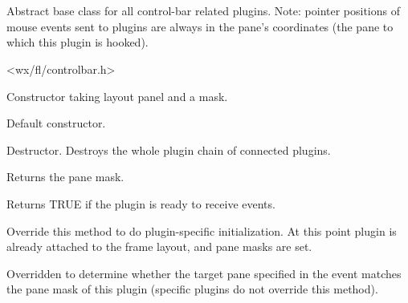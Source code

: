 %
%


\section{}\label{cbpluginbase}


Abstract base class for all control-bar related plugins.
Note: pointer positions of mouse events sent to plugins
are always in the pane's coordinates (the pane to which
this plugin is hooked).




<wx/fl/controlbar.h>




\label{cbpluginbasecbpluginbase}


Constructor taking layout panel and a mask.



Default constructor.


\label{cbpluginbasedtor}


Destructor. Destroys the whole plugin chain of connected plugins.


\label{cbpluginbasegetpanemask}


Returns the pane mask.


\label{cbpluginbaseisready}


Returns TRUE if the plugin is ready to receive events.


\label{cbpluginbaseoninitplugin}


Override this method to do plugin-specific initialization.
At this point plugin is already attached to the frame layout,
and pane masks are set.


\label{cbpluginbaseprocessevent}


Overridden to determine whether the target pane specified in the
event matches the pane mask of this plugin (specific plugins
do not override this method).

